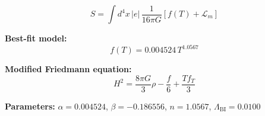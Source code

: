 
\begin{equation}
  S = \int d^4x \, |e| \, \frac{1}{16\pi G} \left[ f(T) + \mathcal{L}_m \right]
\end{equation}

\textbf{Best-fit model:}
\begin{equation}
  f(T) = 0.004524 \, T^{1.0567}
\end{equation}

\textbf{Modified Friedmann equation:}
\begin{equation}
  H^2 = \frac{8\pi G}{3} \rho - \frac{f}{6} + \frac{T f_T}{3}
\end{equation}

\textbf{Parameters:}
$\alpha = 0.004524$, \quad
$\beta = -0.186556$, \quad
$n = 1.0567$, \quad
$\Lambda_{\text{BI}} = 0.0100$